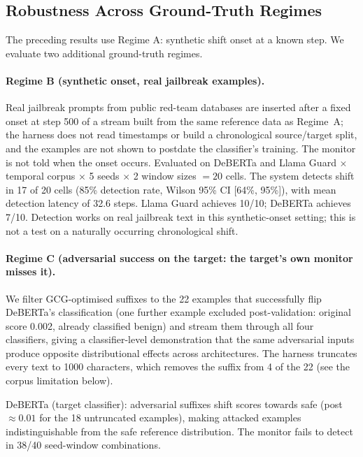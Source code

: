 \documentclass{article}
\begin{document}
\subsection{Robustness Across Ground-Truth Regimes}
\label{sec:regimes}

The preceding results use Regime A: synthetic shift onset at a known step. We evaluate two additional ground-truth regimes.

\paragraph{Regime B (synthetic onset, real jailbreak examples).} Real jailbreak prompts from public red-team databases are inserted after a fixed onset at step 500 of a stream built from the same reference data as Regime~A; the harness does not read timestamps or build a chronological source/target split, and the examples are not shown to postdate the classifier's training. The monitor is not told when the onset occurs. Evaluated on DeBERTa and Llama Guard $\times$ temporal corpus $\times$ 5 seeds $\times$ 2 window sizes $= 20$ cells. The system detects shift in 17 of 20 cells (85\% detection rate, Wilson 95\% CI [64\%, 95\%]), with mean detection latency of 32.6 steps. Llama Guard achieves 10/10; DeBERTa achieves 7/10. Detection works on real jailbreak text in this synthetic-onset setting; this is not a test on a naturally occurring chronological shift.

\paragraph{Regime C (adversarial success on the target: the target's own monitor misses it).}
\label{sec:regime-c}
We filter GCG-optimised suffixes to the 22 examples that successfully flip DeBERTa's classification (one further example excluded post-validation: original score 0.002, already classified benign) and stream them through all four classifiers, giving a classifier-level demonstration that the same adversarial inputs produce opposite distributional effects across architectures. The harness truncates every text to 1000 characters, which removes the suffix from 4 of the 22 (see the corpus limitation below).

DeBERTa (target classifier): adversarial suffixes shift scores towards safe (post $\approx 0.01$ for the 18 untruncated examples), making attacked examples indistinguishable from the safe reference distribution. The monitor fails to detect in 38/40 seed-window combinations.
\end{document}
